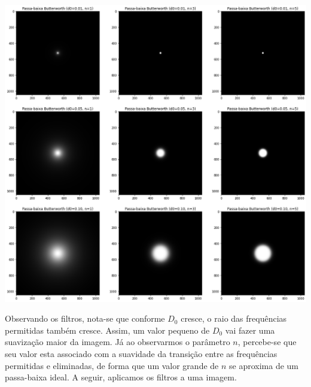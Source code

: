 \documentclass[12pt,a4paper]{article}
\begin{document}
\vspace{1em}
\begin{center}
	\includegraphics[width=\textwidth]{filtros_low_pass}
\end{center}
\vspace{1em}

Observando os filtros, nota-se que conforme $D_0$ cresce, o raio das frequências permitidas também cresce. Assim, um valor pequeno de $D_0$ vai fazer uma suavização maior da imagem. Já ao observarmos o parâmetro $n$, percebe-se que seu valor esta associado com a suavidade da transição entre as frequências permitidas e eliminadas, de forma que um valor grande de $n$ se aproxima de um passa-baixa ideal. A seguir, aplicamos os filtros a uma imagem.
\end{document}
